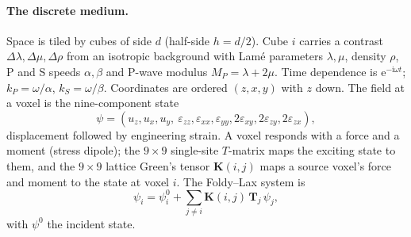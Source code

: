 \documentclass[11pt,a4paper]{article}
\newcommand{\bT}{\mathbf{T}}
\newcommand{\bK}{\mathbf{K}}
\begin{document}
\paragraph{The discrete medium.} Space is tiled by cubes of side $d$ (half-side $h=d/2$). Cube $i$
carries a contrast $\Delta\lambda,\Delta\mu,\Delta\rho$ from an isotropic background with Lamé
parameters $\lambda,\mu$, density $\rho$, P and S speeds $\alpha,\beta$ and P-wave modulus
$M_P=\lambda+2\mu$. Time dependence is $\mathrm{e}^{-\mathrm{i}\omega t}$; $k_P=\omega/\alpha$, $k_S=\omega/\beta$.
Coordinates are ordered $(z,x,y)$ with $z$ down. The field at a voxel is the nine-component state
\begin{equation}
  \psi=(u_z,u_x,u_y,\ \varepsilon_{zz},\varepsilon_{xx},\varepsilon_{yy},
  2\varepsilon_{xy},2\varepsilon_{zy},2\varepsilon_{zx}),
\end{equation}
displacement followed by engineering strain. A voxel responds with a force and a moment (stress
dipole); the $9\times9$ single-site $T$-matrix maps the exciting state to them, and the $9\times9$
lattice Green's tensor $\bK(i,j)$ maps a source voxel's force and moment to the state at voxel $i$.
The Foldy--Lax system is
\begin{equation}\label{eq:foldylax}
  \psi_i=\psi^0_i+\sum_{j\neq i}\bK(i,j)\,\bT_j\,\psi_j ,
\end{equation}
with $\psi^0$ the incident state.
\end{document}
